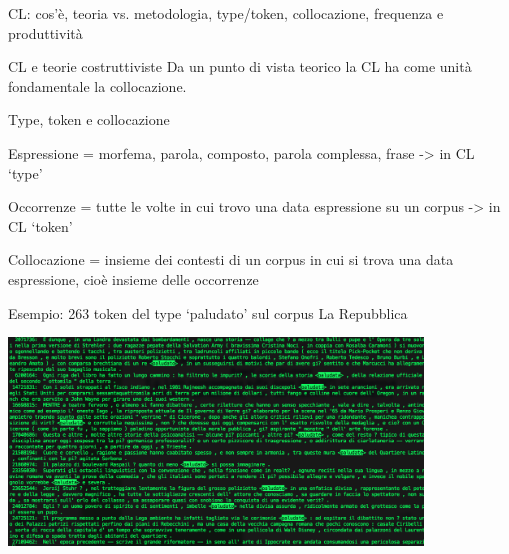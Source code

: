 \documentclass[pdf]{prosper}
\begin{document}
\begin{tsectionandpart}{CL: cos'è, teoria vs. metodologia, type/token, collocazione, frequenza e produttività}
\begin{slide}{CL e teorie costruttiviste}
Da un punto di vista teorico la CL ha come unità fondamentale la collocazione.
\end{slide}

\begin{slide}{Type, token e collocazione}

Espressione = morfema, parola, composto, parola complessa, frase -> in CL `type'

Occorrenze = tutte le volte in cui trovo una data espressione su un corpus -> in CL `token'

Collocazione = insieme dei contesti di un corpus in cui si trova una data espressione, cioè insieme delle occorrenze

Esempio: 263 token del type `paludato' sul corpus La Repubblica

\begin{center}
\includegraphics[width=11cm]{paludato}
\end{center}

\end{slide}

\end{tsectionandpart}
\end{document}
